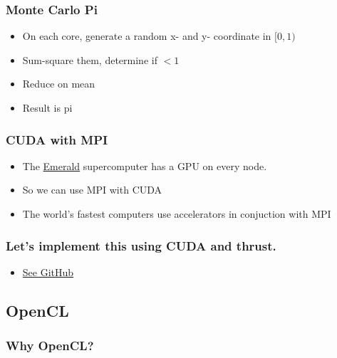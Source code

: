 \subsubsection{Monte Carlo Pi}\label{monte-carlo-pi-1}

\begin{itemize}
\itemsep1pt\parskip0pt
\item
  On each core, generate a random x- and y- coordinate in $[0,1)$
\item
  Sum-square them, determine if $<1$
\item
  Reduce on mean
\item
  Result is pi
\end{itemize}

\subsubsection{CUDA with MPI}\label{cuda-with-mpi}

\begin{itemize}
\itemsep1pt\parskip0pt
\item
  The \href{http://www.cfi.ses.ac.uk/emerald/}{Emerald} supercomputer
  has a GPU on every node.
\item
  So we can use MPI with CUDA
\item
  The world's fastest computers use accelerators in conjuction with MPI
\end{itemize}

\subsubsection{Let's implement this using CUDA and
thrust.}\label{lets-implement-this-using-cuda-and-thrust.}

\begin{itemize}
\itemsep1pt\parskip0pt
\item
  \href{https://github.com/UCL-RITS/emerald_play/blob/master/thrust_monte_pi/monte_pi.cu}{See
  GitHub}
\end{itemize}

\subsection{OpenCL}\label{opencl}

\subsubsection{Why OpenCL?}\label{why-opencl}

